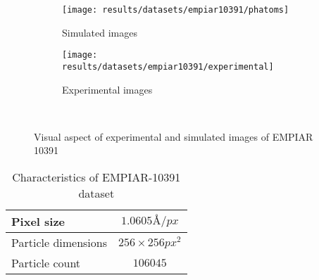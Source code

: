 \documentclass[../main.tex]{subfiles}
\begin{document}
\begin{figure}[htbp]
    \centering
    \begin{subfigure}[b]{0.45\textwidth}
         \centering
         \texttt{[image: results/datasets/empiar10391/phatoms]}
         \caption{Simulated images}
    \end{subfigure}
    \hfill
    \begin{subfigure}[b]{0.45\textwidth}
         \centering
         \texttt{[image: results/datasets/empiar10391/experimental]}
         \caption{Experimental images}
    \end{subfigure}\\
    \caption{Visual aspect of experimental and simulated images of EMPIAR 10391}
    \label{fig:5:empiar10391}
\end{figure}


\begin{table}[hbtp]
    \centering
    \begin{tabular}{|l|c|}
        \hline
        Pixel size & $1.0605 \si{\angstrom/px}$ \\\hline
        Particle dimensions & $256\times256 \si{px^2}$ \\\hline
        Particle count & $106045$ \\\hline
    \end{tabular}
    \caption{Characteristics of EMPIAR-10391 dataset}
    \label{tab:5:empiar10391}
\end{table}
\end{document}
